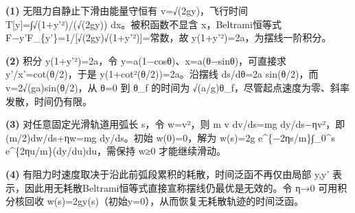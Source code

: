 \par\noindent\textbf{(1)} 无阻力自静止下滑由能量守恒有 v=√(2gy)，飞行时间 T[y]=∫√(1+y'²)/(√(2gy)) dx。被积函数不显含 x，Beltrami恒等式 F−y'F\_\{y'\}=1/[√(2gy)√(1+y'²)]=常数，故 y(1+y'²)=2a，为摆线一阶积分。
\par\noindent\textbf{(2)} 积分 y(1+y'²)=2a，令 y=a(1−cosθ)、x=a(θ−sinθ)，可直接求 y'/x'=cot(θ/2)，于是 y(1+cot²(θ/2))=2a。沿摆线 ds/dθ=2a sin(θ/2)，而 v=2√(ga)sin(θ/2)，从 θ=0 到 θ\_f 的时间为 √(a/g)θ\_f，尽管起点速度为零、斜率发散，时间仍有限。
\par\noindent\textbf{(3)} 对任意固定光滑轨道用弧长 s，令 w=v²，则 m v dv/ds=mg dy/ds−ηv²，即 (m/2)dw/ds+ηw=mg dy/ds。初始 w(0)=0，解为 w(s)=2g e\textasciicircum{}\{−2ηs/m\}∫\_0\textasciicircum{}s e\textasciicircum{}\{2ηu/m\}(dy/du)du，需保持 w≥0 才能继续滑动。
\par\noindent\textbf{(4)} 有阻力时速度取决于沿此前弧段累积的耗散，时间泛函不再仅由局部 y,y' 表示，因此用无耗散Beltrami恒等式直接宣称摆线仍最优是无效的。令 η→0 可用积分核回收 w(s)=2gy(s)（初始y=0），从而恢复无耗散轨迹的时间泛函。

